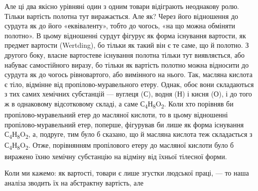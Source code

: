 Але ці два якісно урівняні один з одним товари відіграють
неоднакову ролю. Тільки вартість полотна тут виражається. Але
як? Через його відношення до сурдута як до його «еквіваленту»,
тобто до чогось, «на що можна обміняти полотно». В цьому відношенні
сурдут фігурує як форма існування вартости, як предмет
вартости (Wertding), бо тільки як такий він є те саме, що й полотно.
З другого боку, власне вартостеве існування полотна
тільки тут виявляється, або набуває самостійного виразу, бо
тільки як вартість полотно можна відносити до сурдута як до
чогось рівновартого, або вимінного на нього. Так, масляна кислота
є тіло, відмінне від пропілово-муравельного етеру. Однак, обоє
вони складаються з тих самих хемічних субстанцій — вуглеця
(С), водня (Н) і кисня (О), і до того ж в однаковому відсотковому
складі, а саме С\textsubscript{4}Н\textsubscript{8}O\textsubscript{2}.
Коли хто порівняв би пропілово-муравельний
етер до масляної кислоти, то в цьому відношенні пропілово-муравельний
етер, поперше, фігурував би лише як форма
існування С\textsubscript{4}Н\textsubscript{8}O\textsubscript{2},
а, подруге, тим було б сказано, що й масляна
кислота теж складається з С\textsubscript{4}Н\textsubscript{8}O\textsubscript{2}.
Отже, порівнянням пропілового
етеру до масляної кислоти було б виражено їхню хемічну
субстанцію на відміну від їхньої тілесної форми.

Коли ми кажемо: як вартості, товари є лише згустки людської
праці, — то наша аналіза зводить їх на абстрактну вартість, але
\parbreak{}  %

